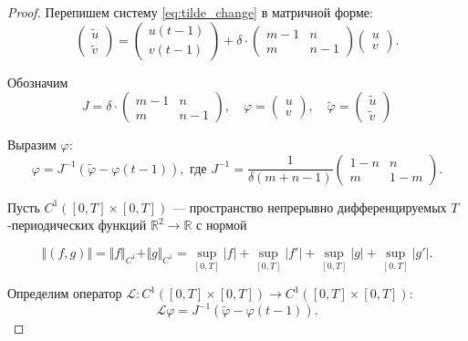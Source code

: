 \begin{proof}
	Перепишем систему \eqref{eq:tilde_change} в матричной форме:
	\[
	\begin{pmatrix}
		\tilde{u}\\
		\tilde{v}
	\end{pmatrix} = 
	\begin{pmatrix}
		u(t - 1)\\
		v(t - 1)
	\end{pmatrix} +
	\delta \cdot
	\begin{pmatrix}
		m - 1 & n \\
		m & n - 1
	\end{pmatrix}
	\begin{pmatrix}
		u\\
		v
	\end{pmatrix}.
	\]
	
	Обозначим
	\[
	J = 
	\delta \cdot
	\begin{pmatrix}
		m - 1 & n \\
		m & n - 1
	\end{pmatrix}, \quad
	\varphi =
	\begin{pmatrix}
		u\\
		v
	\end{pmatrix}, \quad
	\tilde{\varphi} =
	\begin{pmatrix}
		\tilde{u}\\
		\tilde{v}
	\end{pmatrix}
	\]
	
	Выразим $\varphi$:
	\begin{equation}
		\label{eq:tilde_matrix_form}
		\varphi = 
		J^{-1}
		\left(
		\tilde{\varphi} -
		\varphi(t - 1)
		\right),
		\text{ где }
		J^{-1} = \dfrac{1}{\delta(m + n - 1)} 
		\begin{pmatrix}
			1 - n & n \\
			m & 1 - m
		\end{pmatrix}.
	\end{equation}
	
	Пусть $C^1([0, T] \times [0, T])$ --- пространство непрерывно дифференцируемых $T$-периодических функций $\mathbb{R}^2 \to \mathbb{R}$ с нормой
	
	\[\Vert (f, g) \Vert = \Vert f \Vert_{C^1} + \Vert g \Vert_{C^1} = \sup\limits_{[0, T]} |f| + \sup\limits_{[0, T]} |f'| + \sup\limits_{[0, T]} |g| + \sup\limits_{[0, T]} |g'|.\]
	
	Определим оператор $\mathcal{L}:C^1([0, T] \times [0, T]) \to C^1([0, T] \times [0, T])$:
	\[\mathcal{L}\varphi = J^{-1} \left(\tilde{\varphi} - \varphi(t - 1) \right).\]
	

\end{proof}
